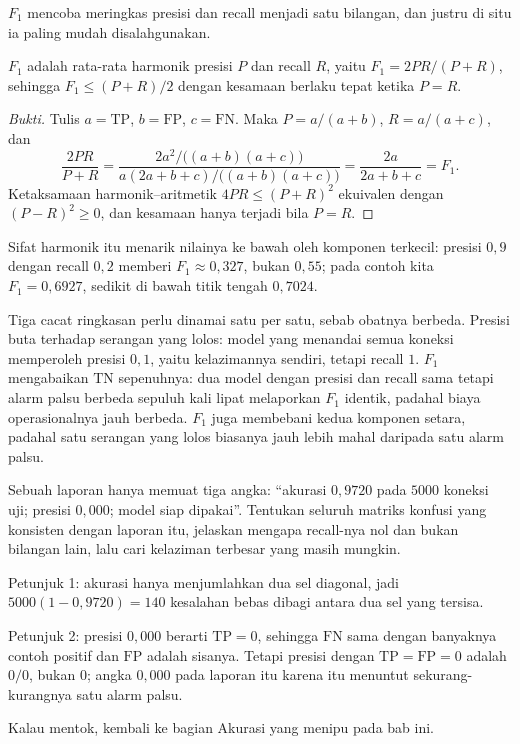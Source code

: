 $F_1$ mencoba meringkas presisi dan recall menjadi satu bilangan, dan justru di situ ia
paling mudah disalahgunakan.

\begin{proposisi}
$F_1$ adalah rata-rata harmonik presisi $P$ dan recall $R$, yaitu $F_1=2PR/(P+R)$,
sehingga $F_1\le(P+R)/2$ dengan kesamaan berlaku tepat ketika $P=R$.
\end{proposisi}

\begin{proof}[Bukti]
Tulis $a=\mathrm{TP}$, $b=\mathrm{FP}$, $c=\mathrm{FN}$. Maka $P=a/(a+b)$,
$R=a/(a+c)$, dan
\[
\frac{2PR}{P+R}
=\frac{2a^2\big/\bigl((a+b)(a+c)\bigr)}{a(2a+b+c)\big/\bigl((a+b)(a+c)\bigr)}
=\frac{2a}{2a+b+c}=F_1 .
\]
Ketaksamaan harmonik--aritmetik $4PR\le(P+R)^2$ ekuivalen dengan $(P-R)^2\ge0$, dan
kesamaan hanya terjadi bila $P=R$.
\end{proof}

Sifat harmonik itu menarik nilainya ke bawah oleh komponen terkecil: presisi $0{,}9$
dengan recall $0{,}2$ memberi $F_1\approx0{,}327$, bukan $0{,}55$; pada contoh kita
$F_1=0{,}6927$, sedikit di bawah titik tengah $0{,}7024$.

Tiga cacat ringkasan perlu dinamai satu per satu, sebab obatnya berbeda. Presisi
buta terhadap serangan yang lolos: model yang menandai semua koneksi memperoleh
presisi $0{,}1$, yaitu kelazimannya sendiri, tetapi recall $1$. $F_1$ mengabaikan
$\mathrm{TN}$ sepenuhnya: dua model dengan presisi dan recall sama tetapi alarm
palsu berbeda sepuluh kali lipat melaporkan $F_1$ identik, padahal biaya
operasionalnya jauh berbeda. $F_1$ juga membebani kedua komponen setara, padahal
satu serangan yang lolos biasanya jauh lebih mahal daripada satu alarm palsu.

\begin{tantangan}
Sebuah laporan hanya memuat tiga angka: ``akurasi $0{,}9720$ pada $5000$ koneksi uji;
presisi $0{,}000$; model siap dipakai''. Tentukan seluruh matriks konfusi yang konsisten
dengan laporan itu, jelaskan mengapa recall-nya nol dan bukan bilangan lain, lalu cari
kelaziman terbesar yang masih mungkin.

Petunjuk 1: akurasi hanya menjumlahkan dua sel diagonal, jadi
$5000(1-0{,}9720)=140$ kesalahan bebas dibagi antara dua sel yang tersisa.

Petunjuk 2: presisi $0{,}000$ berarti $\mathrm{TP}=0$, sehingga $\mathrm{FN}$ sama dengan
banyaknya contoh positif dan $\mathrm{FP}$ adalah sisanya. Tetapi presisi dengan
$\mathrm{TP}=\mathrm{FP}=0$ adalah $0/0$, bukan $0$; angka $0{,}000$ pada laporan itu
karena itu menuntut sekurang-kurangnya satu alarm palsu.

Kalau mentok, kembali ke bagian Akurasi yang menipu pada bab ini.
\end{tantangan}

